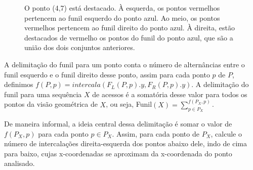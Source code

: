 \begin{figure}
    \caption{O ponto (4,7) está destacado. À esquerda, os pontos vermelhos pertencem ao funil esquerdo do ponto azul. Ao meio, os pontos vermelhos pertencem ao funil direito do ponto azul. À direita, estão destacados de vermelho os pontos do funil do ponto azul, que são a união dos dois conjuntos anteriores.}
\end{figure}

A delimitação do funil para um ponto conta o número de alternâncias entre o funil esquerdo e o funil direito desse ponto, assim para cada ponto $p$ de $P$, definimos $f(P,p) = intercala(F_L(P,p).y, F_R(P,p).y)$. A delimitação do funil para uma sequência $X$ de acessos é a somatória desse valor para todos os pontos da visão geométrica de $X$, ou seja, Funil$(X) = \sum_{p \in P_X}^{f(P_X,p)}$.

De maneira informal, a ideia central dessa delimitação é somar o valor de $f(P_X,p)$ para cada ponto $p \in P_X$. Assim, para cada ponto de $P_X$, calcule o número de intercalações direita-esquerda dos pontos abaixo dele, indo de cima para baixo, cujas x-coordenadas se aproximam da x-coordenada do ponto analisado.

